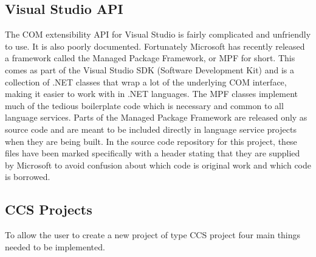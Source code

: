 	\subsection{Visual Studio API}	
	The COM extensibility API for Visual Studio is fairly complicated and 
	unfriendly to use. It is also poorly documented. Fortunately Microsoft has 
	recently released a framework called the Managed Package Framework, or MPF 
	for short. This comes as part of the Visual Studio SDK (Software Development 
	Kit) and is a collection of .NET classes that wrap a lot of the underlying 
	COM interface, making it easier to work with in .NET languages. 
	The MPF classes implement much of the tedious boilerplate code which is 
	necessary and common to all language services. Parts of the Managed Package 
	Framework are released only as source code and are meant to be included 
	directly in language service projects when they are being built. In the 
	source code repository for this project, these files have been marked 
	specifically with a header stating that they are supplied by Microsoft to 
	avoid confusion about which code is original work and which code is 
	borrowed. 

	\subsection{CCS Projects}
	To allow the user to create a new project of type CCS project four main 
	things needed to be implemented.
	
